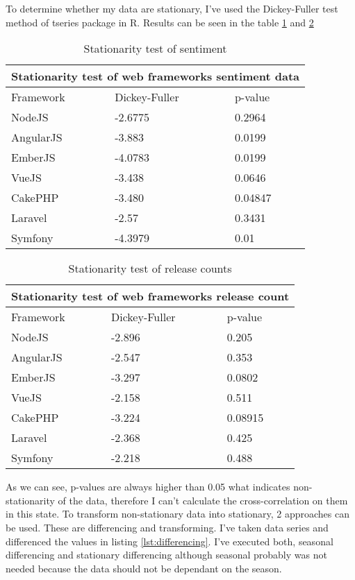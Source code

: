 To determine whether my data are stationary, I've used the Dickey-Fuller test method of tseries package in R. Results can be seen in the table \ref{table:stationarity_table_sentiment} and \ref{table:stationarity_table_release_count} 

\begin{table}[H]
\centering
\begin{tabular}{ |p{3cm}||p{3cm}|p{3cm}|  }
 \hline
 \multicolumn{3}{|c|}{Stationarity test of web frameworks sentiment data} \\
 \hline
 Framework & Dickey-Fuller & p-value\\
 \hline
 NodeJS   & -2.6775    &0.2964\\ \hline
 AngularJS &   -3.883  & 0.0199\\ \hline
 EmberJS & -4.0783 & 0.0199\\ \hline
 VueJS    &-3.438 & 0.0646\\ \hline
 CakePHP&   -3.480  & 0.04847\\ \hline
 Laravel& -2.57  & 0.3431\\ \hline
 Symfony& -4.3979  & 0.01\\ \hline
\end{tabular}
\caption{Stationarity test of sentiment}
\label{table:stationarity_table_sentiment}
\end{table}

\begin{table}[H]
\centering
\begin{tabular}{ |p{3cm}||p{3cm}|p{3cm}|  }
 \hline
 \multicolumn{3}{|c|}{Stationarity test of web frameworks release count} \\
 \hline
 Framework & Dickey-Fuller & p-value\\
 \hline
 NodeJS   & -2.896    &0.205\\ \hline
 AngularJS &   -2.547  & 0.353\\ \hline
 EmberJS & -3.297 & 0.0802\\ \hline
 VueJS    &-2.158 & 0.511\\ \hline
 CakePHP&   -3.224  & 0.08915\\ \hline
 Laravel& -2.368  & 0.425\\ \hline
 Symfony& -2.218  & 0.488\\ \hline
\end{tabular}
\caption{Stationarity test of release counts}
\label{table:stationarity_table_release_count}
\end{table}

As we can see, p-values are always higher than 0.05 what indicates non-stationarity of the data, therefore I can't calculate the cross-correlation on them in this state. To transform non-stationary data into stationary, 2 approaches can be used. These are differencing and transforming.  I've taken data series and differenced the values in listing \ref{lst:differencing}. I've executed both, seasonal differencing and stationary differencing although seasonal probably was not needed because the data should not be dependant on the season.

